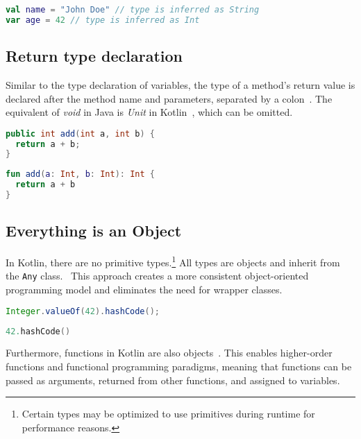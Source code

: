 \documentclass[a4paper, 11pt]{article}
\begin{document}
\begin{lstlisting}[language=Kotlin]
val name = "John Doe" // type is inferred as String
var age = 42 // type is inferred as Int
\end{lstlisting}

\subsection{Return type declaration}
Similar to the type declaration of variables, the type of a method's return value is declared after the method name and parameters, separated by a colon~\cite{functions}.
The equivalent of \textit{void} in Java is \textit{Unit} in Kotlin~\cite{builtin-types-unit,kotlin-stdlib-unit}, which can be omitted. 

\begin{lstlisting}[language=Java,title={Java method declaration}]
public int add(int a, int b) {
  return a + b;
}
\end{lstlisting}

\begin{lstlisting}[language=Kotlin,title={Kotlin method declaration}]
fun add(a: Int, b: Int): Int {
  return a + b
}
\end{lstlisting}

\subsection{Everything is an Object}
In Kotlin, there are no primitive types.\footnote{Certain types may be optimized to use primitives during runtime for performance reasons.} All types are objects and inherit from the \texttt{Any} class.~\cite{basic-types}
This approach creates a more consistent object-oriented programming model and eliminates the need for wrapper classes.

\begin{lstlisting}[language=Java,title={Java Integer Wrapper}]
Integer.valueOf(42).hashCode();
\end{lstlisting}

\begin{lstlisting}[language=Kotlin,title={Kotlin direct usage of Int}]
42.hashCode()
\end{lstlisting}

Furthermore, functions in Kotlin are also objects~\cite{higher-order-functions}. This enables higher-order functions and functional programming paradigms, meaning that functions can be passed as arguments, returned from other functions, and assigned to variables.
\end{document}
